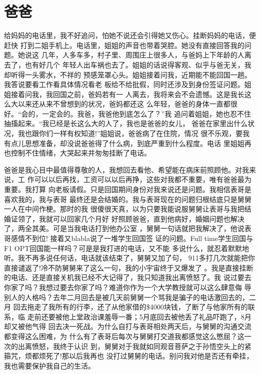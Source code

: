 \documentclass[12pt]{book}
\begin{document}
\section{爸爸}
\label{sec-9-3}

给妈妈的电话里，我不好追问，怕她不说还会引得她又伤心。挂断妈妈的电话，便赶快
打到二姐手机上。电话里，姐姐的声音也带着哭腔。她没有直接回答我的问题。她说这
几年，人多车多，村子里、周围庄上很多人，与爸妈上下年龄的人离去了，也有好几个
年轻人出车祸也去了。姐姐的话说得客观、似乎与爸无关，我却听得一头雾水，不祥的
预感笼罩心头。姐姐接着问我，近期能不能回国一趟。我答说要看工作看具体情况看老
板给不给批假，同时还涉及到身份签证问题。姐姐接着问我，我回国之前，爸妈若有一
人离去，我将来会不会遗憾。这是我长这么大以来还从来不曾想到的状况，爸妈都还这
么年轻，爸爸的身体一直都很好。“会的，一定会的。我爸，我爸他到底怎么了？”我
追问着姐姐，她也忍不住抽搐起来。“我已经是长这么大的人了，我也是爸爸的女儿，
爸爸在家里出什么状况，我也跟你们一样有权知道!”姐姐说，爸爸病了在住院，情况
很不乐观，要我有点儿思想准备，却没说爸爸得了什么病，到底严重到什么程度。电话
里姐姐再也控制不住情绪，大哭起来并匆匆挂断了电话。

爸爸是我心目中最值得尊敬的人，我想回去看他、希望能在病床前照顾他。对我来说，工
作可以以后再找，工资可以以后再挣，这些对我都不重要，唯有爸爸最为重要。我打算
向老板请假。只是回国期间身份对我来说还是问题。我相信表哥是喜欢我的，我与表哥
最终还是会结婚的。我与表哥现在的问题归根结底只是舅舅一人在中间作梗。那时的我
很傻很天真，以为只要我能说服舅舅让表哥与我把结婚证领了，我就可以回家几个月好
好照顾爸爸，直到他病好，婚姻问题也解决了，两全其美。可是当我电话打到他办公室
，舅舅一句话就把我解决了，他说表哥感情不到位! 接着又blabla说了一堆学生回国签
证的问题。Full time学生回国与F1 OPT回国能一样吗？可是是我打进的电话，又不能
多说什么，就忍着默默地听。我不再多说任何话，电话就该结束了，舅舅又加了句，
911多打几次就能把你直接谴返了!冷不防舅舅来了这么一句，我的小宇宙终于又爆发了
。我是直接挂断的电话、还是直接关机我已经不大记得了，我只知道我出离愤怒了。我
说过要去你家了吗？我想过要去你家了吗？难道你作为一个大学教授就可以这么肆意侮
辱别人的人格吗？去年二月回去是被几天前舅舅一个骂我是骗子的电话激回去的，二月
回去拖走了我所有的行李，还了从他家借的\$4000块钱，了断了与他家所有的联系，临
走前还要被他上堂政治课羞辱一番；5月底回去被他丢了礼品吓跑了，8月却又被他气得
回去决一死战。为什么自打与表哥相处两天后，与舅舅的沟通交流都变得这么困难，为
什么有了表哥后每次与舅舅打交道我都感觉这么憋屈？这一次的出离愤怒，我终于认识
到，舅舅对于我就如同观音菩萨之于孙悟空头上的紧箍咒，烦都烦死了!那以后我再也
没打过舅舅的电话。别问我对他是否还有牵挂，我也需要保护我自己的生活。
\end{document}
